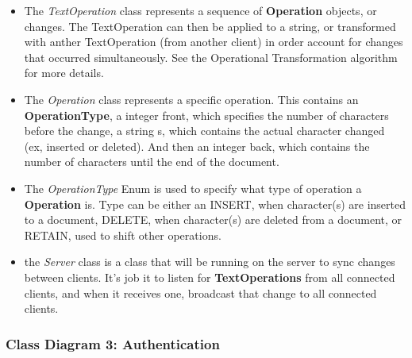\documentclass[twoside,letterpaper]{article}
\begin{document}
	\begin{itemize}
	\item The \textit{TextOperation} class represents a sequence of \textbf{Operation} objects, or changes. The TextOperation can then be applied to a string, or transformed with anther TextOperation (from another client) in order account for changes that occurred simultaneously. See the Operational Transformation algorithm for more details.
	\item The \textit{Operation} class represents a specific operation. This contains an \textbf{OperationType}, a integer front, which specifies the number of characters before the change, a string s, which contains the actual character changed (ex, inserted or deleted). And then an integer back, which contains the number of characters until the end of the document.
	\item The \textit{OperationType} Enum is used to specify what type of operation a \textbf{Operation} is. Type can be either an INSERT, when character(s) are inserted to a document, DELETE, when character(s) are deleted from a document, or RETAIN, used to shift other operations.
	\item the \textit{Server} class is a class that will be running on the server to sync changes between clients. It's job it to listen for \textbf{TextOperations} from all connected clients, and when it receives one, broadcast that change to all connected clients.
	\end{itemize}
	\newpage
	\subsubsection[Class Diagram 3: Authentication]{\rmfamily\bfseries\color{black}
		Class Diagram 3: Authentication}
	\hypertarget{RefHeading22059017292}{}
	\bigskip
	
\end{document}
